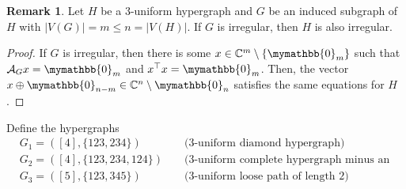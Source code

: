 \documentclass[12pt]{article}
\numberwithin{equation}{section}
\theoremstyle{definition}
\newtheorem{remark}{Remark}
\newcommand{\ev}[1]{( #1 )}
\newcommand{\C}{\mathbb{C}}
\begin{document}
\begin{remark}
\label{rmk:induced_subgraph_zero}
Let $H$ be a $3$-uniform hypergraph and $G$ be an induced subgraph of $H$ with $|V\ev{G}| = m \leq n = |V\ev{H}|$. If $G$ is irregular, then $H$ is also irregular. 
\end{remark}
\begin{proof}
If $G$ is irregular, then there is some $x\in \C^m \setminus \{\mymathbb{0}_m \}$ such that $\mathcal{A}_G x = \mymathbb{0}_m$ and $x^\top x = \mymathbb{0}_m$. Then, the vector $x \oplus \mymathbb{0}_{n-m} \in \C^n \setminus {\mymathbb{0}_n} $ satisfies the same equations for $H$. 
\end{proof}

Define the hypergraphs
\begin{align*} 
& G_1 = \ev{ [4], \{ 123, 234\} } && \text{ (3-uniform diamond hypergraph) }\\
& G_2 = \ev{ [4], \{ 123, 234, 124 \} } && \text{ (3-uniform complete hypergraph minus an edge) }\\
& G_3 = \ev{ [5], \{ 123, 345 \} } && \text{ (3-uniform loose path of length 2) }
\end{align*}
\end{document}
